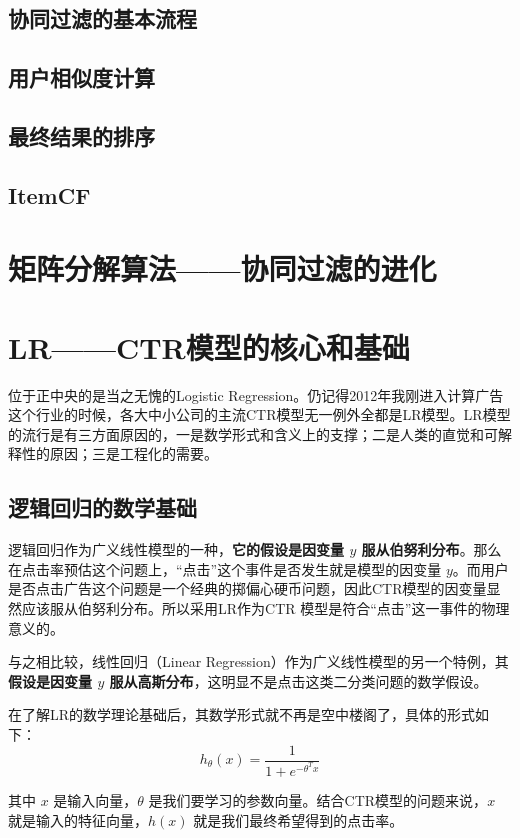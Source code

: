 \documentclass[12pt]{article}
\begin{document}
\subsection{协同过滤的基本流程}

\subsection{用户相似度计算}

\subsection{最终结果的排序}

\subsection{ItemCF}

\section{矩阵分解算法——协同过滤的进化}

\section{LR——CTR模型的核心和基础}
位于正中央的是当之无愧的Logistic Regression。仍记得2012年我刚进入计算广告这个行业的时候，各大中小公司的主流CTR模型无一例外全都是LR模型。LR模型的流行是有三方面原因的，一是数学形式和含义上的支撑；二是人类的直觉和可解释性的原因；三是工程化的需要。

\subsection{逻辑回归的数学基础}
逻辑回归作为广义线性模型的一种，\textbf{它的假设是因变量 $y$ 服从伯努利分布}。那么在点击率预估这个问题上，“点击”这个事件是否发生就是模型的因变量 $y$。而用户是否点击广告这个问题是一个经典的掷偏心硬币问题，因此CTR模型的因变量显然应该服从伯努利分布。所以采用LR作为CTR 模型是符合“点击”这一事件的物理意义的。

与之相比较，线性回归（Linear Regression）作为广义线性模型的另一个特例，其\textbf{假设是因变量 $y$ 服从高斯分布}，这明显不是点击这类二分类问题的数学假设。

在了解LR的数学理论基础后，其数学形式就不再是空中楼阁了，具体的形式如下：
$$
h_\theta(x) = \frac{1}{1 + e^{-\theta^Tx}}
$$

其中 $x$ 是输入向量，$\theta$ 是我们要学习的参数向量。结合CTR模型的问题来说，$x$ 就是输入的特征向量，$h(x)$ 就是我们最终希望得到的点击率。
\end{document}
